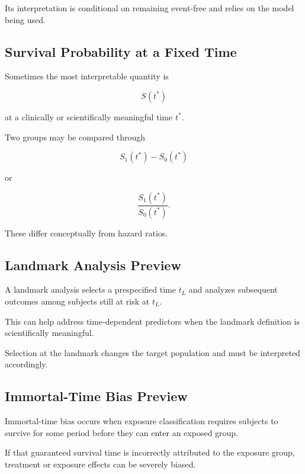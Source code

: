 Its interpretation is conditional on remaining event-free and relies on
the model being used.

\subsection{Survival Probability at a Fixed Time}
\label{subsec:survival-fixed-time}

Sometimes the most interpretable quantity is

\[
\boxed{
S(t^*)
}
\]

at a clinically or scientifically meaningful time \(t^*\).

Two groups may be compared through

\[
\boxed{
S_1(t^*)-S_0(t^*)
}
\]

or

\[
\boxed{
\frac{
S_1(t^*)
}{
S_0(t^*)
}.
}
\]

These differ conceptually from hazard ratios.

\subsection{Landmark Analysis Preview}
\label{subsec:landmark-analysis}

A landmark analysis selects a prespecified time \(t_L\) and analyzes
subsequent outcomes among subjects still at risk at \(t_L\).

This can help address time-dependent predictors when the landmark
definition is scientifically meaningful.

Selection at the landmark changes the target population and must be
interpreted accordingly.

\subsection{Immortal-Time Bias Preview}
\label{subsec:immortal-time-bias}

Immortal-time bias occurs when exposure classification requires subjects
to survive for some period before they can enter an exposed group.

If that guaranteed survival time is incorrectly attributed to the
exposure group, treatment or exposure effects can be severely biased.


